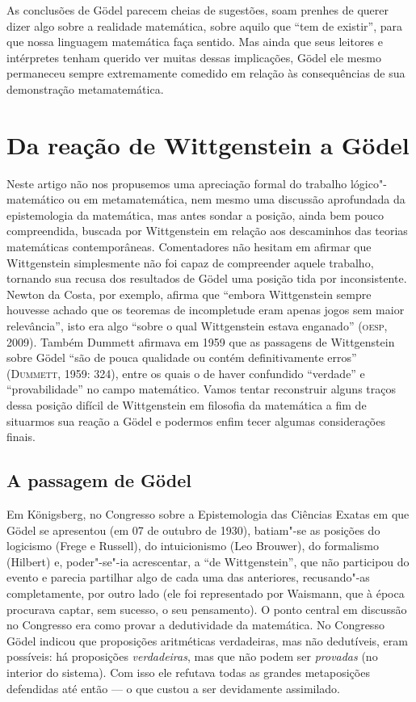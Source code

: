 {As conclusões de Gödel parecem cheias de sugestões, soam
prenhes de querer dizer algo sobre a realidade matemática, sobre
aquilo que ``tem de existir'',
para que nossa linguagem matemática faça sentido. Mas ainda que
seus leitores e intérpretes tenham querido ver muitas dessas
implicações, Gödel ele mesmo permaneceu sempre extremamente
comedido em relação às consequências de sua demonstração
metamatemática.

\section{Da reação de Wittgenstein a
Gödel}

Neste artigo não nos propusemos uma apreciação formal do
trabalho lógico"-matemático ou em metamatemática, nem mesmo uma
discussão aprofundada da epistemologia da matemática, mas antes
sondar a posição, ainda bem pouco compreendida, buscada por
Wittgenstein em relação aos descaminhos das teorias matemáticas
contemporâneas. Comentadores não hesitam em afirmar que
Wittgenstein simplesmente não foi capaz de compreender aquele
trabalho, tornando sua recusa dos resultados de Gödel uma
posição tida por inconsistente. Newton da Costa, por exemplo,
afirma que “embora Wittgenstein sempre houvesse achado que os
teoremas de incompletude eram apenas jogos sem maior
relevância”, isto era algo “sobre o qual Wittgenstein estava
enganado” (\textsc{oesp}, 2009). Também Dummett afirmava em 1959 que as
passagens de Wittgenstein sobre Gödel “são de pouca qualidade ou
contém definitivamente erros” (\textsc{Dummett}, 1959: 324), entre os
quais o de haver confundido
``verdade'' e
``provabilidade'' no campo
matemático. Vamos tentar reconstruir alguns traços dessa posição
difícil de Wittgenstein em filosofia da matemática a fim de
situarmos sua reação a Gödel e podermos enfim tecer algumas
considerações finais.

\subsection{A passagem de Gödel}

Em Königsberg, no Congresso sobre a Epistemologia das
Ciências Exatas em que Gödel se apresentou (em 07 de outubro de
1930), batiam"-se as posições do logicismo (Frege e Russell), do
intuicionismo (Leo Brouwer), do formalismo (Hilbert) e,
poder"-se"-ia acrescentar, a ``de
Wittgenstein'', que não participou do evento e
parecia partilhar algo de cada uma das anteriores, recusando"-as
completamente, por outro lado (ele foi representado por
Waismann, que à época procurava captar, sem sucesso, o seu
pensamento). O ponto central em discussão no Congresso era como
provar a dedutividade da matemática. No Congresso Gödel indicou
que proposições aritméticas verdadeiras, mas não dedutíveis,
eram possíveis: há proposições \emph{verdadeiras}, mas que não
podem ser \emph{provadas} (no interior do sistema). Com isso
ele refutava todas as grandes metaposições defendidas até então
--- o que custou a ser devidamente assimilado.

}

